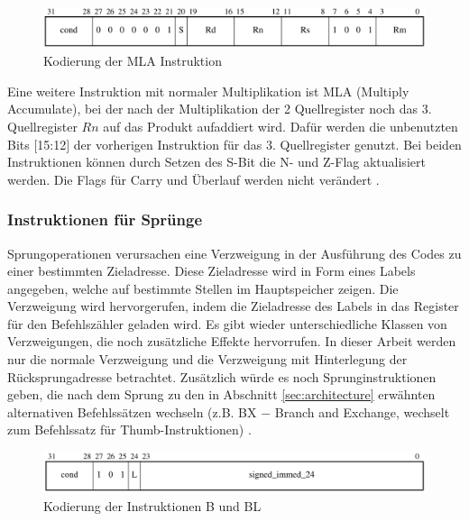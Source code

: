 \documentclass[a4paper, 11pt, onecolumn]{article}
\begin{document}
\begin{figure}[!htb]
\centering
\includegraphics[width=1\textwidth]{data/mla}
\caption{Kodierung der MLA Instruktion \cite{arm:2005}}
\label{fig:mla}
\end{figure}

Eine weitere Instruktion mit normaler Multiplikation ist MLA (Multiply Accumulate), bei der nach der Multiplikation der 2 Quellregister noch das 3. Quellregister $Rn$ auf das Produkt aufaddiert wird. Dafür werden die unbenutzten Bits $[$15:12$]$ der vorherigen Instruktion für das 3. Quellregister genutzt. Bei beiden Instruktionen können durch Setzen des S-Bit die N- und Z-Flag aktualisiert werden. Die Flags für Carry und Überlauf werden nicht verändert \cite{arm:2005}.

\subsubsection{Instruktionen für Sprünge}

Sprungoperationen verursachen eine Verzweigung in der Ausführung des Codes zu einer bestimmten Zieladresse. Diese Zieladresse wird in Form eines Labels angegeben, welche auf bestimmte Stellen im Hauptspeicher zeigen. Die Verzweigung wird hervorgerufen, indem die Zieladresse des Labels in das Register für den Befehlszähler geladen wird. Es gibt wieder unterschiedliche Klassen von Verzweigungen, die noch zusätzliche Effekte hervorrufen. In dieser Arbeit werden nur die normale Verzweigung und die Verzweigung mit Hinterlegung der Rücksprungadresse betrachtet. Zusätzlich würde es noch Sprunginstruktionen geben, die nach dem Sprung zu den in Abschnitt \ref{sec:architecture} erwähnten alternativen Befehlssätzen wechseln (z.B. BX $-$ Branch and Exchange, wechselt zum Befehlssatz für Thumb-Instruktionen) \cite{arm:2005}.

\begin{figure}[!htb]
\centering
\includegraphics[width=1\textwidth]{data/jump}
\caption{Kodierung der Instruktionen B und BL \cite{arm:2005}}
\label{fig:jump}
\end{figure}
\end{document}
